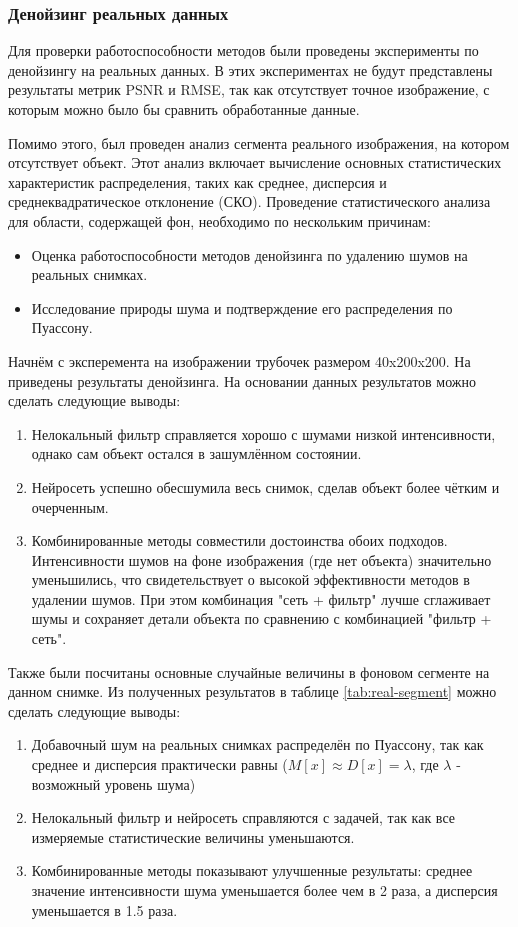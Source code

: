 \subsubsection{Денойзинг реальных данных}
\par Для проверки работоспособности методов были проведены эксперименты по денойзингу на реальных данных. В этих экспериментах не будут представлены результаты метрик PSNR и RMSE, так как отсутствует точное изображение, с которым можно было бы сравнить обработанные данные.
\par  Помимо этого, был проведен анализ сегмента реального изображения, на котором отсутствует объект. Этот анализ включает вычисление основных статистических характеристик распределения, таких как среднее, дисперсия и среднеквадратическое отклонение (СКО). Проведение статистического анализа для области, содержащей фон, необходимо по нескольким причинам:
\begin{itemize}[]
	\item Оценка работоспособности методов денойзинга по удалению шумов на реальных снимках.
	\item Исследование природы шума и подтверждение его распределения по Пуассону.
\end{itemize}
\par Начнём с эксперемента на изображении трубочек размером 40x200x200. На  приведены результаты денойзинга. На основании данных результатов можно сделать следующие выводы:
\begin{enumerate}[]
	\item Нелокальный фильтр справляется хорошо с шумами низкой интенсивности, однако сам объект остался в зашумлённом состоянии.
	\item Нейросеть успешно обесшумила весь снимок, сделав объект более чётким и очерченным.
	\item Комбинированные методы совместили достоинства обоих подходов. Интенсивности шумов на фоне изображения (где нет объекта) значительно уменьшились, что свидетельствует о высокой эффективности методов в удалении шумов. При этом комбинация "сеть + фильтр" лучше сглаживает шумы и сохраняет детали объекта по сравнению с комбинацией "фильтр + сеть".
\end{enumerate}
\par Также были посчитаны основные случайные величины в фоновом сегменте на данном снимке. Из полученных результатов в таблице  \ref{tab:real-segment} можно сделать следующие выводы:
\begin{enumerate}[]
	\item Добавочный шум на реальных снимках распределён по Пуассону, так как среднее и дисперсия практически  равны ($M[x] \approx D[x] = \lambda$, где $\lambda$ - возможный уровень шума)
	\item Нелокальный фильтр и нейросеть справляются с задачей, так как все измеряемые статистические величины уменьшаются.
	\item Комбинированные методы показывают улучшенные результаты: среднее значение интенсивности шума уменьшается более чем в 2 раза, а дисперсия уменьшается в 1.5 раза.
\end{enumerate}
